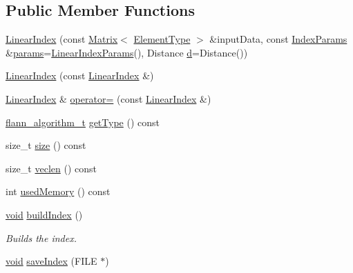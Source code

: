 \subsection*{Public Member Functions}
\begin{DoxyCompactItemize}
\item 
\hyperlink{classcvflann_1_1LinearIndex_a7dcb2dc1cb43563d435c98e9bcff6819}{Linear\-Index} (const \hyperlink{classcvflann_1_1Matrix}{Matrix}$<$ \hyperlink{classcvflann_1_1LinearIndex_a7a42eebeec43b6f10fd8e2ffb6516959}{Element\-Type} $>$ \&input\-Data, const \hyperlink{namespacecvflann_a742b4c7076c21012054af74a9ee48289}{Index\-Params} \&\hyperlink{compat_8hpp_a0480a03ecc41b20cde376602531d9270}{params}=\hyperlink{structcvflann_1_1LinearIndexParams}{Linear\-Index\-Params}(), Distance \hyperlink{legacy_8hpp_a6f364afbe132c4ecfea48bde1b0618ba}{d}=Distance())
\item 
\hyperlink{classcvflann_1_1LinearIndex_af5c5b7871b17c6000c3d39fb5427fe13}{Linear\-Index} (const \hyperlink{classcvflann_1_1LinearIndex}{Linear\-Index} \&)
\item 
\hyperlink{classcvflann_1_1LinearIndex}{Linear\-Index} \& \hyperlink{classcvflann_1_1LinearIndex_aa0a727cd172f30e9febcbc29fd18e185}{operator=} (const \hyperlink{classcvflann_1_1LinearIndex}{Linear\-Index} \&)
\item 
\hyperlink{namespacecvflann_a4e3e6c98d774ea77fd7f0045c9bc7817}{flann\-\_\-algorithm\-\_\-t} \hyperlink{classcvflann_1_1LinearIndex_a9887a3e2597fbe66c7748678e7d63ad8}{get\-Type} () const 
\item 
size\-\_\-t \hyperlink{classcvflann_1_1LinearIndex_a9201c12dfd14713a493bc0dce7e5858e}{size} () const 
\item 
size\-\_\-t \hyperlink{classcvflann_1_1LinearIndex_a9b9b92be1c7f4c7ce3574043da538c13}{veclen} () const 
\item 
int \hyperlink{classcvflann_1_1LinearIndex_aa829cf0503e9695ba18ec4495bad3e51}{used\-Memory} () const 
\item 
\hyperlink{legacy_8hpp_a8bb47f092d473522721002c86c13b94e}{void} \hyperlink{classcvflann_1_1LinearIndex_ad1d52caca28b27a7e3db3455a8bd4fca}{build\-Index} ()
\begin{DoxyCompactList}\small\item\em Builds the index. \end{DoxyCompactList}\item 
\hyperlink{legacy_8hpp_a8bb47f092d473522721002c86c13b94e}{void} \hyperlink{classcvflann_1_1LinearIndex_abc3e5507e360267d9248192c757633e7}{save\-Index} (F\-I\-L\-E $\ast$)

\end{DoxyCompactItemize}
